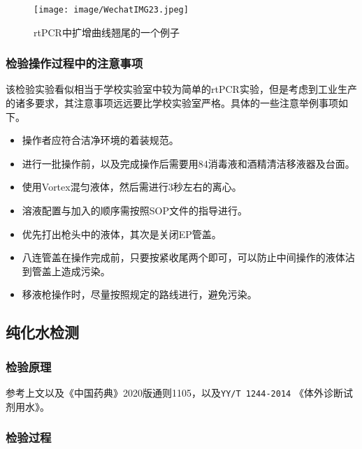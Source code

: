 \begin{figure}[H]
    \centering
    \texttt{[image: image/WechatIMG23.jpeg]}
    \caption{rtPCR中扩增曲线翘尾的一个例子}
    \label{rtres}
\end{figure}

\subsubsection{检验操作过程中的注意事项}

该检验实验看似相当于学校实验室中较为简单的rtPCR实验，但是考虑到工业生产的诸多要求，其注意事项远远要比学校实验室严格。具体的一些注意举例事项如下。
\begin{itemize}
    \item 操作者应符合洁净环境的着装规范。
    \item 进行一批操作前，以及完成操作后需要用84消毒液和酒精清洁移液器及台面。
    \item 使用Vortex混匀液体，然后需进行3秒左右的离心。
    \item 溶液配置与加入的顺序需按照SOP文件的指导进行。
    \item 优先打出枪头中的液体，其次是关闭EP管盖。
    \item 八连管盖在操作完成前，只要按紧收尾两个即可，可以防止中间操作的液体沾到管盖上造成污染。
    \item 移液枪操作时，尽量按照规定的路线进行，避免污染。
\end{itemize}

\subsection{纯化水检测}

\subsubsection{检验原理}
参考上文以及《中国药典》2020版通则1105，以及\texttt{YY/T 1244-2014} 《体外诊断试剂用水》。

\subsubsection{检验过程}
